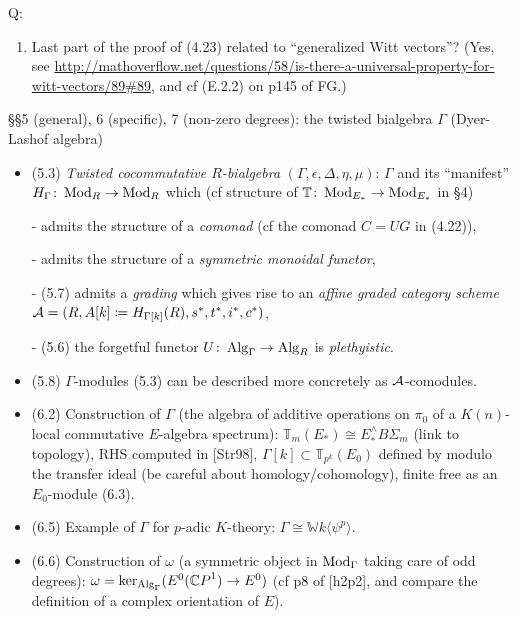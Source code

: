 \documentclass{rs}
\theoremstyle{definition}
\theoremstyle{remark}
\def\co{\colon\thinspace}
\newcommand{\mb}[1]{\mathbb{#1}}
\renewcommand{\=}{\approx}
\renewcommand{\-}{\sim}
\numberwithin{equation}{section}
\numberwithin{thm}{section}
\begin{document}
Q:
\begin{enumerate}
 \item Last part of the proof of (4.23) related to ``generalized Witt vectors''? 
 (Yes, see \url{http://mathoverflow.net/questions/58/is-there-a-universal-property-for-witt-vectors/89#89}, and cf (E.2.2) on p145 of FG.)
\end{enumerate}

\S\S 5 (general), 6 (specific), 7 (non-zero degrees): the twisted bialgebra $\Gamma$ (Dyer-Lashof algebra)
\begin{itemize}
 \item (5.3) {\em Twisted cocommutative $R$-bialgebra} $(\Gamma, \epsilon, \Delta, \eta, \mu)$: $\Gamma$ and its ``manifest'' $H_\Gamma \co {\rm Mod}_R \to {\rm Mod}_R$ which 
 (cf structure of ${\mb T} \co {\rm Mod}_{E_*} \to {\rm Mod}_{E_*}$ in \S 4)

 - admits the structure of a {\em comonad} (cf the comonad $C = UG$ in (4.22)),

 - admits the structure of a {\em symmetric monoidal functor},

 - (5.7) admits a {\em grading} which gives rise to an {\em affine graded category scheme} ${\cal A} = (R, A[k] \coloneqq H_{\Gamma [k]}(R), s^*, t^*, i^*, c^*)$,

 - (5.6) the forgetful functor $U \co {\rm Alg}_{\Gamma} \to {\rm Alg}_R$ is {\em plethyistic}.

 \item (5.8) $\Gamma$-modules (5.3) can be described more concretely as $\cal A$-comodules.

 \item (6.2) Construction of $\Gamma$ (the algebra of additive operations on $\pi_0$ of a $K(n)$-local commutative $E$-algebra spectrum): 
 ${\mb T}_m (E_*) \cong E_*^\wedge B\Sigma_m$ (link to topology), RHS computed in [Str98], 
 $\Gamma[k] \subset {\mb T}_{p^k} (E_0)$ defined by modulo the transfer ideal (be careful about homology/cohomology), 
 finite free as an $E_0$-module (6.3).

 \item (6.5) Example of $\Gamma$ for $p$-adic $K$-theory: $\Gamma \cong {\mb W}k \langle \psi^p \rangle$.

 \item (6.6) Construction of $\omega$ (a symmetric object in ${\rm Mod}_\Gamma$ taking care of odd degrees): 
 $\omega = {\rm ker}_{{\rm Alg}_\Gamma} (E^0({\mb CP}^1) \to E^0)$ (cf p8 of [h2p2], and compare the definition of a complex orientation of $E$).


\end{itemize}
\end{document}
